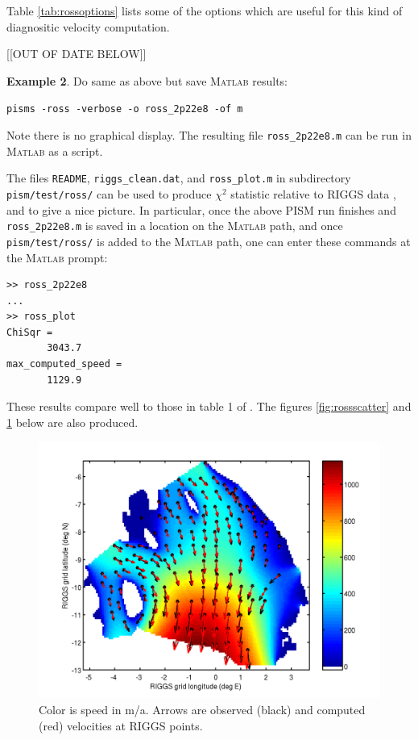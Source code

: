 \documentclass[11pt,final]{amsart}
\newcommand{\Matlab}{\textsc{Matlab}\xspace}
\begin{document}
Table \ref{tab:rossoptions} lists some of the options which are useful for this kind of diagnositic velocity computation.


[[OUT OF DATE BELOW]]


\noindent\textbf{Example 2}.  Do same as above but save \Matlab results:

\verb|pisms -ross -verbose -o ross_2p22e8 -of m|

\noindent Note there is no graphical display.  The resulting file \verb|ross_2p22e8.m| can be run in \Matlab as a script.

The files \verb|README|, \verb|riggs_clean.dat|, and \verb|ross_plot.m| in subdirectory \verb|pism/test/ross/| can be used to produce $\chi^2$ statistic relative to RIGGS data \cite{MacAyealetal}, and to give a nice picture.  In particular, once the above PISM run finishes and \verb|ross_2p22e8.m| is saved in a location on the \Matlab path, and once \verb|pism/test/ross/| is added to the \Matlab path, one can enter these commands at the \Matlab prompt:
\small\begin{verbatim}
>> ross_2p22e8
...
>> ross_plot
ChiSqr =
       3043.7
max_computed_speed =
       1129.9
\end{verbatim}
\normalsize
These results compare well to those in table 1 of \cite{MacAyealetal}.  The figures \ref{fig:rossscatter} and \ref{fig:rossvelocities} below are also produced.

\begin{figure}[ht]
\includegraphics[width=4.5in,keepaspectratio=true]{figs/rossvelocities}
\caption{Color is speed in m/a.  Arrows are observed (black) and computed (red) velocities at RIGGS points.}
\label{fig:rossvelocities}
\end{figure}
\end{document}
